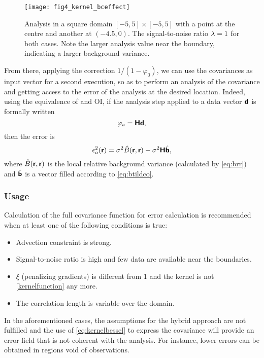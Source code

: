 \begin{figure}[htpb]
\centering
\texttt{[image: fig4\_kernel\_bceffect]}
\caption{Analysis in a square domain $[-5,5]\times[-5,5]$ with a point at the centre and another at $(-4.5,0)$. The signal-to-noise ratio $\lambda=1$ for both cases. Note the larger analysis value near the boundary, indicating a larger background variance.
\label{fig:fig4_kernel_bceffect}}
\end{figure} 
 
From there, applying the correction $1/(1-\varphi_0)$, we can use the covariances as input vector for a second \diva execution, so as to perform an analysis of the covariance and getting access to the error of the analysis at the desired location. Indeed, using the equivalence of \diva and OI, if the analysis step applied to a data vector $\mbox{\boldmath $ \protect\mathsf{d} $}$ is formally written 
\begin{equation}
\varphi_a = \mbox{\boldmath $ \protect\mathsf{H} $} \mbox{\boldmath $ \protect\mathsf{d} $},
\end{equation}
then the error is 
\begin{equation}
\epsilon_a^2 (\mbox{\boldmath $ \protect\mathsf{r} $}) = \sigma^2 \hat{B}(\mbox{\boldmath $ \protect\mathsf{r} $},\mbox{\boldmath $ \protect\mathsf{r} $}) - \sigma^2 \mbox{\boldmath $ \protect\mathsf{H} $} \hat{\mbox{\boldmath $ \protect\mathsf{b} $}},
\end{equation}
where $\hat{B}(\mbox{\boldmath $ \protect\mathsf{r} $},\mbox{\boldmath $ \protect\mathsf{r} $})$ is the local relative background variance (calculated by \eqref{eq:brr}) and $\hat{\mbox{\boldmath $ \protect\mathsf{b} $}}$ is a vector filled according to \eqref{eq:btildco}.

\subsubsection{Usage}

Calculation of the full covariance function for error calculation is recommended when at least one of the following conditions is true:
\begin{itemize}
\item Advection constraint is strong.
\item Signal-to-noise ratio is high and few data are available near the boundaries.
\item $\xi$ (penalizing gradients) is different from 1 and the kernel is not \eqref{kernelfunction} any more. 
\item The correlation length is variable over the domain. 
\end{itemize}

In the aforementioned cases, the assumptions for the hybrid approach are not fulfilled and the use of \eqref{eq:kernelbessel} to express the covariance will provide an error field that is not coherent with the analysis. For instance, lower errors can be obtained in regions void of observations. 

